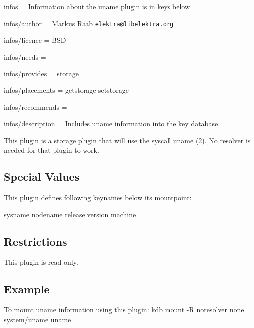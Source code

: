 
\begin{DoxyItemize}
\item infos = Information about the uname plugin is in keys below
\item infos/author = Markus Raab \href{mailto:elektra@libelektra.org}{\tt elektra@libelektra.\+org}
\item infos/licence = B\+S\+D
\item infos/needs =
\item infos/provides = storage
\item infos/placements = getstorage setstorage
\item infos/recommends =
\item infos/description = Includes uname information into the key database.
\end{DoxyItemize}

This plugin is a storage plugin that will use the syscall {\ttfamily uname (2)}. No resolver is needed for that plugin to work.

\subsection*{Special Values}

This plugin defines following keynames below its mountpoint\+: \begin{DoxyVerb}    sysname
    nodename
    release
    version
    machine
\end{DoxyVerb}


\subsection*{Restrictions}

This plugin is read-\/only.

\subsection*{Example}

To mount uname information using this plugin\+: {\ttfamily kdb mount -\/\+R noresolver none system/uname uname} 